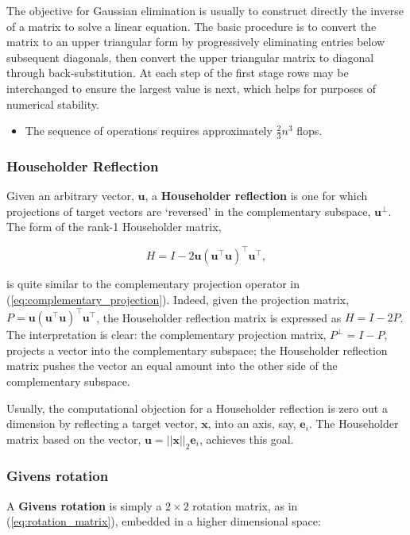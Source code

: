 \documentclass[12pt, twoside, draft]{article}
\begin{document}
The objective for Gaussian elimination is usually to construct directly the inverse of a matrix to solve a linear equation. The basic procedure is to convert the matrix to an upper triangular form by progressively eliminating entries below subsequent diagonals, then convert the upper triangular matrix to diagonal through back-substitution.  At each step of the first stage rows may be interchanged to ensure the largest value is next, which helps for purposes of numerical stability.
\begin{itemize}
\item The sequence of operations requires approximately $\frac{2}{3} n^3$ flops.
\end{itemize}

\subsubsection{Householder Reflection}\label{sec:householder-reflection}
Given an arbitrary vector, $\mathbf{u}$, a \textbf{Householder reflection} is one for which projections of target vectors are `reversed' in the complementary subspace, $\mathbf{u}^\perp$.  The form of the rank-1 Householder matrix,

\begin{equation}\label{eq:Householder_reflection}
H = I - 2 \mathbf{u} \left( \mathbf{u}^\top \mathbf{u} \right)^\top \mathbf{u}^\top ,
\end{equation}

is quite similar to the complementary projection operator in (\ref{eq:complementary_projection}).  Indeed, given the projection matrix, $P = \mathbf{u} \left( \mathbf{u}^\top \mathbf{u} \right)^\top \mathbf{u}^\top$, the Householder reflection matrix is expressed as $H = I - 2P$.  The interpretation is clear: the complementary projection matrix, $P^\perp = I - P$, projects a vector into the complementary subspace; the Householder reflection matrix pushes the vector an equal amount into the other side of the complementary subspace.

Usually, the computational objection for a Householder reflection is zero out a dimension by reflecting a target vector, $\mathbf{x}$, into an axis, say, $\mathbf{e}_i$.  The Householder matrix based on the vector, $\mathbf{u} = ||\mathbf{x}||_2 \mathbf{e}_i$, achieves this goal.

\subsubsection{Givens rotation}\label{sec:givens-rotation}
A \textbf{Givens rotation} is simply a $2 \times 2$ rotation matrix, as in (\ref{eq:rotation_matrix}), embedded in a higher dimensional space:
\end{document}

